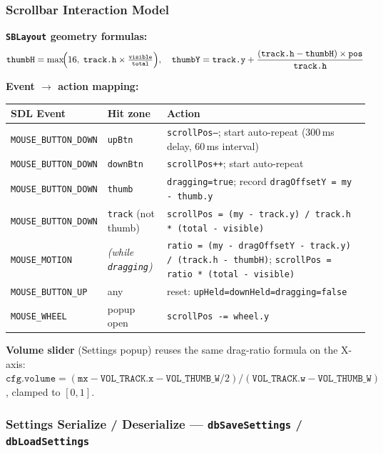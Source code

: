 \documentclass[12pt,a4paper]{article}
\begin{document}
\subsubsection{Scrollbar Interaction Model}

\noindent\textbf{\texttt{SBLayout} geometry formulas:}
\[
  \texttt{thumbH} = \max\!\Bigl(16,\; \texttt{track.h} \times
    \tfrac{\texttt{visible}}{\texttt{total}}\Bigr),
  \quad
  \texttt{thumbY} = \texttt{track.y} +
    \frac{(\texttt{track.h} - \texttt{thumbH}) \times \texttt{pos}}{\texttt{track.h}}
\]

\noindent\textbf{Event $\rightarrow$ action mapping:}

\begin{center}\small
\begin{tabular}{@{}p{4.2cm} p{2.5cm} p{6.0cm}@{}}
\hline
\textbf{SDL Event} & \textbf{Hit zone} & \textbf{Action} \\
\hline
\texttt{MOUSE\_BUTTON\_DOWN} & \texttt{upBtn} &
  \texttt{scrollPos--}; start auto-repeat (300\,ms delay, 60\,ms interval) \\
\texttt{MOUSE\_BUTTON\_DOWN} & \texttt{downBtn} &
  \texttt{scrollPos++}; start auto-repeat \\
\texttt{MOUSE\_BUTTON\_DOWN} & \texttt{thumb} &
  \texttt{dragging=true}; record \texttt{dragOffsetY = my - thumb.y} \\
\texttt{MOUSE\_BUTTON\_DOWN} & \texttt{track} (not thumb) &
  \texttt{scrollPos = (my - track.y) / track.h * (total - visible)} \\
\texttt{MOUSE\_MOTION} & \textit{(while \texttt{dragging})} &
  \texttt{ratio = (my - dragOffsetY - track.y) / (track.h - thumbH)};
  \texttt{scrollPos = ratio * (total - visible)} \\
\texttt{MOUSE\_BUTTON\_UP} & any &
  reset: \texttt{upHeld=}\allowbreak\texttt{downHeld=}\allowbreak\texttt{dragging=false} \\
\texttt{MOUSE\_WHEEL} & popup open &
  \texttt{scrollPos -= wheel.y} \\
\hline
\end{tabular}
\end{center}

\noindent\textbf{Volume slider} (Settings popup) reuses the same drag-ratio formula
on the X-axis: $\texttt{cfg.volume} = (\texttt{mx} - \texttt{VOL\_TRACK.x}
- \texttt{VOL\_THUMB\_W}/2) / (\texttt{VOL\_TRACK.w} - \texttt{VOL\_THUMB\_W})$,
clamped to $[0,1]$.

\subsubsection{Settings Serialize / Deserialize --- \texttt{dbSaveSettings} /
\texttt{dbLoadSettings}}
\end{document}
